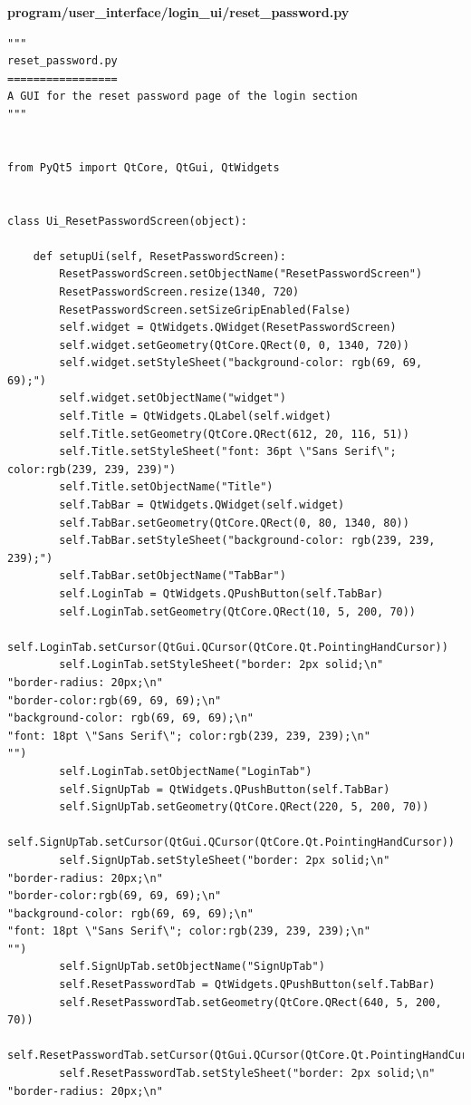 \documentclass[12pt]{article}
\begin{document}
\textbf{program/user\_interface/login\_ui/reset\_password.py}
\begin{lstlisting}
"""
reset_password.py
=================
A GUI for the reset password page of the login section
"""


from PyQt5 import QtCore, QtGui, QtWidgets


class Ui_ResetPasswordScreen(object):

    def setupUi(self, ResetPasswordScreen):
        ResetPasswordScreen.setObjectName("ResetPasswordScreen")
        ResetPasswordScreen.resize(1340, 720)
        ResetPasswordScreen.setSizeGripEnabled(False)
        self.widget = QtWidgets.QWidget(ResetPasswordScreen)
        self.widget.setGeometry(QtCore.QRect(0, 0, 1340, 720))
        self.widget.setStyleSheet("background-color: rgb(69, 69, 69);")
        self.widget.setObjectName("widget")
        self.Title = QtWidgets.QLabel(self.widget)
        self.Title.setGeometry(QtCore.QRect(612, 20, 116, 51))
        self.Title.setStyleSheet("font: 36pt \"Sans Serif\"; color:rgb(239, 239, 239)")
        self.Title.setObjectName("Title")
        self.TabBar = QtWidgets.QWidget(self.widget)
        self.TabBar.setGeometry(QtCore.QRect(0, 80, 1340, 80))
        self.TabBar.setStyleSheet("background-color: rgb(239, 239, 239);")
        self.TabBar.setObjectName("TabBar")
        self.LoginTab = QtWidgets.QPushButton(self.TabBar)
        self.LoginTab.setGeometry(QtCore.QRect(10, 5, 200, 70))
        self.LoginTab.setCursor(QtGui.QCursor(QtCore.Qt.PointingHandCursor))
        self.LoginTab.setStyleSheet("border: 2px solid;\n"
"border-radius: 20px;\n"
"border-color:rgb(69, 69, 69);\n"
"background-color: rgb(69, 69, 69);\n"
"font: 18pt \"Sans Serif\"; color:rgb(239, 239, 239);\n"
"")
        self.LoginTab.setObjectName("LoginTab")
        self.SignUpTab = QtWidgets.QPushButton(self.TabBar)
        self.SignUpTab.setGeometry(QtCore.QRect(220, 5, 200, 70))
        self.SignUpTab.setCursor(QtGui.QCursor(QtCore.Qt.PointingHandCursor))
        self.SignUpTab.setStyleSheet("border: 2px solid;\n"
"border-radius: 20px;\n"
"border-color:rgb(69, 69, 69);\n"
"background-color: rgb(69, 69, 69);\n"
"font: 18pt \"Sans Serif\"; color:rgb(239, 239, 239);\n"
"")
        self.SignUpTab.setObjectName("SignUpTab")
        self.ResetPasswordTab = QtWidgets.QPushButton(self.TabBar)
        self.ResetPasswordTab.setGeometry(QtCore.QRect(640, 5, 200, 70))
        self.ResetPasswordTab.setCursor(QtGui.QCursor(QtCore.Qt.PointingHandCursor))
        self.ResetPasswordTab.setStyleSheet("border: 2px solid;\n"
"border-radius: 20px;\n"

\end{lstlisting}
\end{document}
